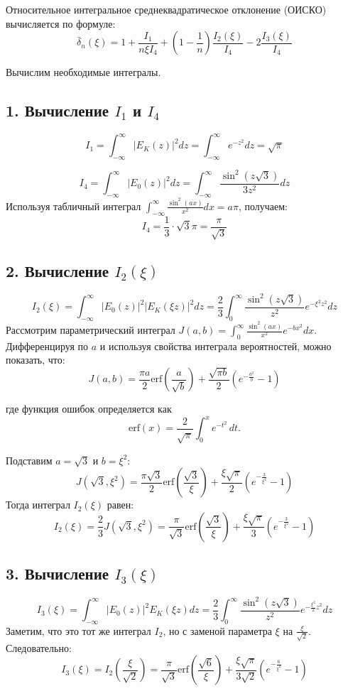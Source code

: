 \documentclass[12pt,a4paper]{article}
\begin{document}
Относительное интегральное среднеквадратическое отклонение (ОИСКО) вычисляется по формуле:
$$\bar{\delta}_n(\xi) = 1 + \frac{I_1}{n\xi I_4} + \left(1 - \frac{1}{n}\right)\frac{I_2(\xi)}{I_4} - 2\frac{I_3(\xi)}{I_4}$$

Вычислим необходимые интегралы.

\subsection*{1. Вычисление $I_1$ и $I_4$}
$$I_1 = \int_{-\infty}^{\infty} |E_K(z)|^2 dz = \int_{-\infty}^{\infty} e^{-z^2} dz = \sqrt{\pi}$$

$$I_4 = \int_{-\infty}^{\infty} |E_0(z)|^2 dz = \int_{-\infty}^{\infty} \frac{\sin^2(z\sqrt{3})}{3z^2} dz$$
Используя табличный интеграл $\int_{-\infty}^{\infty} \frac{\sin^2(ax)}{x^2} dx = a\pi$, получаем:
$$I_4 = \frac{1}{3} \cdot \sqrt{3}\pi = \frac{\pi}{\sqrt{3}}$$

\subsection*{2. Вычисление $I_2(\xi)$}
$$I_2(\xi) = \int_{-\infty}^{\infty} |E_0(z)|^2 |E_K(\xi z)|^2 dz = \frac{2}{3} \int_{0}^{\infty} \frac{\sin^2(z\sqrt{3})}{z^2} e^{-\xi^2 z^2} dz$$
Рассмотрим параметрический интеграл $J(a, b) = \int_{0}^{\infty} \frac{\sin^2(ax)}{x^2} e^{-bx^2} dx$. Дифференцируя по $a$ и используя свойства интеграла вероятностей, можно показать, что:
$$J(a,b) = \frac{\pi a}{2} \text{erf}\left(\frac{a}{\sqrt{b}}\right) + \frac{\sqrt{\pi b}}{2} \left(e^{-\frac{a^2}{b}} - 1\right)$$

где функция ошибок определяется как
\[
\text{erf}(x) = \frac{2}{\sqrt{\pi}} \int_{0}^{x} e^{-t^2} \, dt.
\]

Подставим $a = \sqrt{3}$ и $b = \xi^2$:
$$J(\sqrt{3}, \xi^2) = \frac{\pi \sqrt{3}}{2} \text{erf}\left(\frac{\sqrt{3}}{\xi}\right) + \frac{\xi\sqrt{\pi}}{2} \left(e^{-\frac{3}{\xi^2}} - 1\right)$$
Тогда интеграл $I_2(\xi)$ равен:
$$I_2(\xi) = \frac{2}{3} J(\sqrt{3}, \xi^2) = \frac{\pi}{\sqrt{3}} \text{erf}\left(\frac{\sqrt{3}}{\xi}\right) + \frac{\xi\sqrt{\pi}}{3} \left(e^{-\frac{3}{\xi^2}} - 1\right)$$

\subsection*{3. Вычисление $I_3(\xi)$}
$$I_3(\xi) = \int_{-\infty}^{\infty} |E_0(z)|^2 E_K(\xi z) dz = \frac{2}{3} \int_{0}^{\infty} \frac{\sin^2(z\sqrt{3})}{z^2} e^{-\frac{\xi^2}{2} z^2} dz$$
Заметим, что это тот же интеграл $I_2$, но с заменой параметра $\xi$ на $\frac{\xi}{\sqrt{2}}$. Следовательно:
$$I_3(\xi) = I_2\left(\frac{\xi}{\sqrt{2}}\right) = \frac{\pi}{\sqrt{3}} \text{erf}\left(\frac{\sqrt{6}}{\xi}\right) + \frac{\xi\sqrt{\pi}}{3\sqrt{2}} \left(e^{-\frac{6}{\xi^2}} - 1\right)$$
\end{document}
